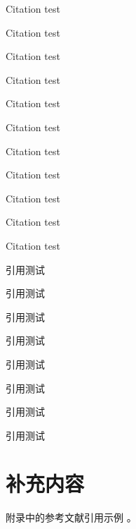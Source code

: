 \documentclass[degree=doctor]{thuthesis}
\begin{document}
\START
\showoutput

Citation \cite{crane1972invisible} test\par
Citation \cite{baker1995future} test\par
Citation \cite{jha2004effect} test\par

Citation \citet{baker1995future} test\par
Citation \citet[42]{baker1995future} test\par
Citation \citep{baker1995future} test\par
Citation \citep[42]{baker1995future} test\par
Citation \citep[see][]{baker1995future} test\par
Citation \citep[see][42]{baker1995future} test\par
Citation \citet*{baker1995future} test\par
Citation \citep*{baker1995future} test\par

引用\citet{wangbing1997dianzi}测试\par
引用\citet[42]{wangbing1997dianzi}测试\par
引用\citep{wangbing1997dianzi}测试\par
引用\citep[42]{wangbing1997dianzi}测试\par
引用\citep[见][]{wangbing1997dianzi}测试\par
引用\citep[见][42]{wangbing1997dianzi}测试\par
引用\citet*{wangbing1997dianzi}测试\par
引用\citep*{wangbing1997dianzi}测试\par

\nocite{*}

\printbibliography


\appendix

\chapter{补充内容}

附录\cite{crane1972invisible}中的参考文献引用\cite{jha2004effect}示例
\cite{crane1972invisible,jha2004effect}。

\printbibliography

\clearpage
\OMIT
\end{document}
